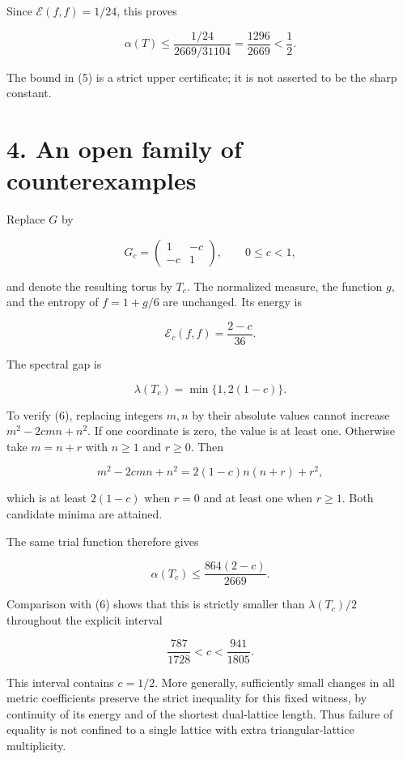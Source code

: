 \documentclass[11pt,a4paper]{article}
\begin{document}
Since \(\mathcal E(f,f)=1/24\), this proves

\[
\boxed{\alpha(T)\leq\frac{1/24}{2669/31104}
=\frac{1296}{2669}<\frac12.}
\tag{5}
\]

The bound in (5) is a strict upper certificate; it is not asserted to be
the sharp constant.

\hypertarget{1019-an-open-family-of-counterexamples}{%
\section{4. An open family of
counterexamples}\label{1019-an-open-family-of-counterexamples}}

Replace \(G\) by

\[
G_c=\begin{pmatrix}1&-c\\-c&1\end{pmatrix},\qquad0\leq c<1,
\]

and denote the resulting torus by \(T_c\). The normalized measure, the
function \(g\), and the entropy of \(f=1+g/6\) are unchanged. Its energy
is

\[
\mathcal E_c(f,f)=\frac{2-c}{36}.
\]

The spectral gap is

\[
\lambda(T_c)=\min\{1,2(1-c)\}.
\tag{6}
\]

To verify (6), replacing integers \(m,n\) by their absolute values
cannot increase \(m^2-2cmn+n^2\). If one coordinate is zero, the value
is at least one. Otherwise take \(m=n+r\) with \(n\geq1\) and
\(r\geq0\). Then

\[
m^2-2cmn+n^2=2(1-c)n(n+r)+r^2,
\]

which is at least \(2(1-c)\) when \(r=0\) and at least one when
\(r\geq1\). Both candidate minima are attained.

The same trial function therefore gives

\[
\alpha(T_c)\leq\frac{864(2-c)}{2669}.
\]

Comparison with (6) shows that this is strictly smaller than
\(\lambda(T_c)/2\) throughout the explicit interval

\[
\boxed{\frac{787}{1728}<c<\frac{941}{1805}.}
\]

This interval contains \(c=1/2\). More generally, sufficiently small
changes in all metric coefficients preserve the strict inequality for
this fixed witness, by continuity of its energy and of the shortest
dual-lattice length. Thus failure of equality is not confined to a
single lattice with extra triangular-lattice multiplicity.
\end{document}
